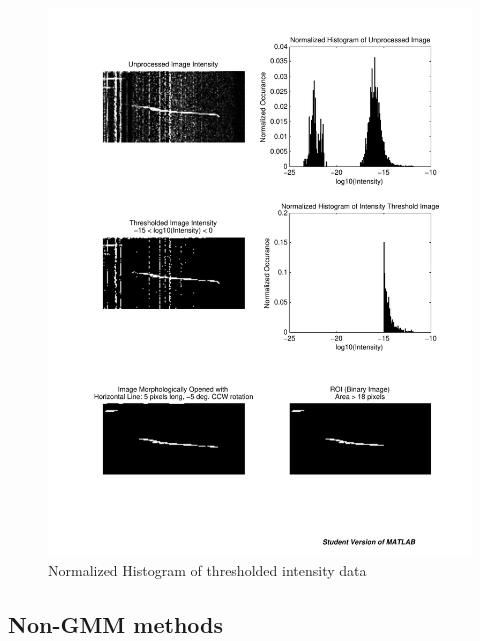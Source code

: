 \begin{figure}
\begin{minipage}[b]{0.5\linewidth}
		\includegraphics[trim=300 295 45 275,clip,width=1\linewidth]{gfx/SimpleThres}
		\caption{Normalized Histogram of thresholded intensity data}\label{fig:bwThist}
	\end{minipage}
\end{figure}

\FloatBarrier
\subsection{Non-GMM methods}
